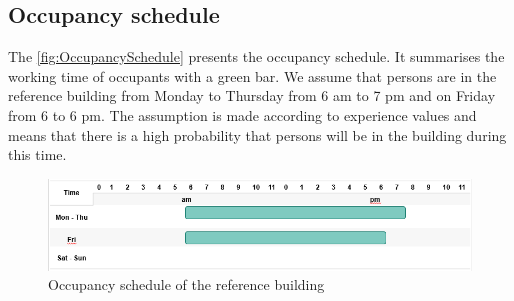 \subsection{Occupancy schedule}
\label{subsec:OccupancySchedule}
The \autoref{fig:OccupancySchedule} presents the occupancy schedule. It summarises the working time of occupants with a green bar. We assume that persons are in the reference building from Monday to Thursday from 6 am to 7 pm and on Friday from 6 to 6 pm. The assumption is made according to experience values and means that there is a high probability that persons will be in the building during this time.  
    \begin{figure}[h]
            \centering
            \includegraphics[width=15cm]{figure/Occupancy schedule.PNG}
           \caption{Occupancy schedule of the reference building}
           \label{fig:OccupancySchedule}
    \end{figure}

